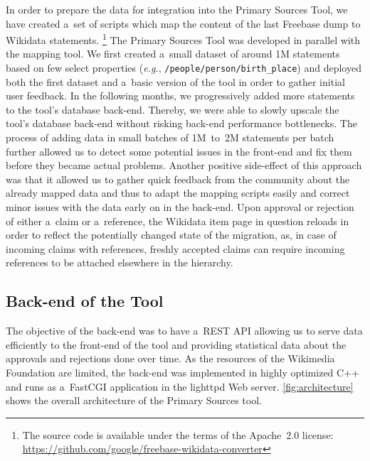 \documentclass{acm_proc_article-sp}
\begin{document}
In order to prepare the data for integration into the Primary Sources Tool,
we have created a~set of scripts which map the content
of the last Freebase dump to Wikidata statements.%
\footnote{The source code is available under the terms of the Apache~2.0 license:
\url{https://github.com/google/freebase-wikidata-converter}}
The Primary Sources Tool was developed in parallel with the mapping tool.
We first created a~small dataset of around 1M statements
based on few select properties (\emph{e.g.}, \texttt{/people/person/birth\_place})
and deployed both the first dataset and a~basic version of the tool
in order to gather initial user feedback.
In the following months, we progressively added more statements to the tool's database back-end.
Thereby, we were able to slowly upscale the tool's database back-end
without risking back-end performance bottlenecks.
The process of adding data in small batches of 1M~to~2M statements per batch
further allowed us to detect some potential issues in the front-end
and fix them before they became actual problems.
Another positive side-effect of this approach was that it allowed us to gather quick feedback
from the community about the already mapped data and thus to adapt the mapping scripts easily
and correct minor issues with the data early on in the back-end.
Upon approval or rejection of either a~claim or a~reference,
the Wikidata item page in question reloads in order to reflect
the potentially changed state of the migration, as,
in case of incoming claims with references, freshly accepted claims 
can require incoming references to be attached elsewhere in the hierarchy. 

\subsection{Back-end of the Tool}

The objective of the back-end was to have a~REST API allowing us
to serve data efficiently to the front-end of the tool and
providing statistical data about the approvals and rejections done over time.
As the resources of the Wikimedia Foundation are limited,
the back-end was implemented in highly optimized C++
and runs as a~FastCGI application in the lighttpd Web server.
\autoref{fig:architecture} shows the overall architecture of the Primary Sources tool.
\end{document}

